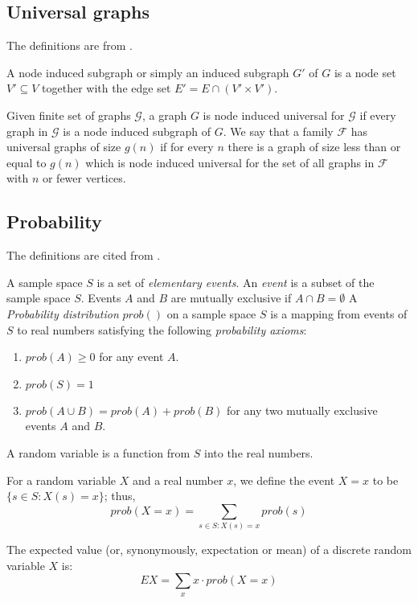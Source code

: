 \subsection{Universal graphs}
The definitions are from .
		\begin{definition} \label{dfn:node-induced}
			A node induced subgraph or simply an induced subgraph $G'$ of $G$ is a node set $V' \subseteq V$ together with the edge set $E' = E \cap (V' \times V')$.
		\end{definition}
		\begin{definition} \label{dfn:universal}
			Given finite set of graphs $\mathcal{G}$, a graph $G$ is node induced universal for  $\mathcal{G}$ if every graph in $\mathcal{G}$ is a node induced subgraph of $G$.
			We say that a family $\mathcal{F}$ has universal graphs of size $g(n)$ if for every $n$ there is a graph of size less than or equal to $g(n)$ which is node induced universal for 	the set of all graphs in $\mathcal{F}$
			with $n$ or fewer vertices.
		\end{definition}
			
\subsection{Probability}
\begin{definition}\label{dfn:prob}
	The definitions  are cited from .
	
	 A sample space $S$ is a set of \emph{elementary events}.
	An \emph{event} is a subset of the sample space $S$.
	Events $A$ and $B$ are mutually exclusive if $ A \cap B = \emptyset $
	A \emph{Probability distribution} $prob()$ on a sample space $S$ is a mapping from events of $S$ to real numbers satisfying the following \emph{probability axioms}:
	\begin{enumerate}
		\item $prob(A) \geq 0$ for any event $A$.
		\item $prob(S) = 1$
		\item $prob(A \cup B) =prob(A)+ prob(B)  $ for any two mutually exclusive events $A$ and $B$.
	\end{enumerate}
	
	A random variable is a function from $S$ into the real numbers.
	
	For a random variable $X$ and a real number $x$, we define the event  $X = x$ to be $\{ s \in S : X(s) = x \}$; thus,
	$$ prob(X=x)  = \sum_{s \in S:X(s)=x} prob(s)$$
	
	The expected value (or, synonymously, expectation or mean) of a discrete random variable $X$ is:
	$$EX=\sum_{x} x \cdot prob(X=x)$$
	
	\end{definition}
